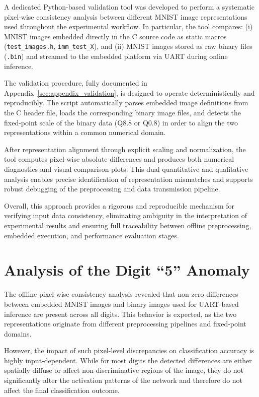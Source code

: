 A dedicated Python-based validation tool was developed to perform a systematic
pixel-wise consistency analysis between different MNIST image representations
used throughout the experimental workflow.
In particular, the tool compares:
(i) MNIST images embedded directly in the C source code as static macros
(\texttt{test\_images.h}, \texttt{imm\_test\_X}), and
(ii) MNIST images stored as raw binary files (\texttt{.bin}) and streamed to the
embedded platform via UART during online inference.

The validation procedure, fully documented in
Appendix~\ref{sec:appendix_validation}, is designed to operate deterministically
and reproducibly.
The script automatically parses embedded image definitions from the C header file,
loads the corresponding binary image files, and detects the fixed-point scale of
the binary data (Q8.8 or Q0.8) in order to align the two representations within a
common numerical domain.

After representation alignment through explicit scaling and normalization, the
tool computes pixel-wise absolute differences and produces both numerical
diagnostics and visual comparison plots.
This dual quantitative and qualitative analysis enables precise identification of
representation mismatches and supports robust debugging of the preprocessing and
data transmission pipeline.

Overall, this approach provides a rigorous and reproducible mechanism for
verifying input data consistency, eliminating ambiguity in the interpretation of
experimental results and ensuring full traceability between offline preprocessing,
embedded execution, and performance evaluation stages.



\section{Analysis of the Digit ``5'' Anomaly}

The offline pixel-wise consistency analysis revealed that non-zero differences
between embedded MNIST images and binary images used for UART-based inference are
present across all digits.
This behavior is expected, as the two representations originate from different
preprocessing pipelines and fixed-point domains.

However, the impact of such pixel-level discrepancies on classification accuracy
is highly input-dependent.
While for most digits the detected differences are either spatially diffuse or
affect non-discriminative regions of the image, they do not significantly alter
the activation patterns of the network and therefore do not affect the final
classification outcome.

